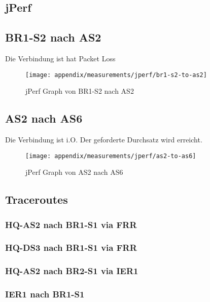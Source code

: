 \subsection{jPerf}

\subsection{BR1-S2 nach AS2}
Die Verbindung ist hat Packet Loss
\begin{figure}[h]
	\centering
	\texttt{[image: appendix/measurements/jperf/br1-s2-to-as2]}
	\caption{jPerf Graph von BR1-S2 nach AS2}
	\label{fig:as2-to-as6}
\end{figure}

\subsection{AS2 nach AS6}
Die Verbindung ist i.O. Der geforderte Durchsatz wird erreicht.
\begin{figure}[h]
\centering
\texttt{[image: appendix/measurements/jperf/as2-to-as6]}
\caption{jPerf Graph von AS2 nach AS6}
\label{fig:as2-to-as6}
\end{figure}



\subsection{Traceroutes}
\subsubsection{HQ-AS2 nach BR1-S1 via FRR}


\subsubsection{HQ-DS3 nach BR1-S1 via FRR}


\subsubsection{HQ-AS2 nach BR2-S1 via IER1}


\subsubsection{IER1 nach BR1-S1}


